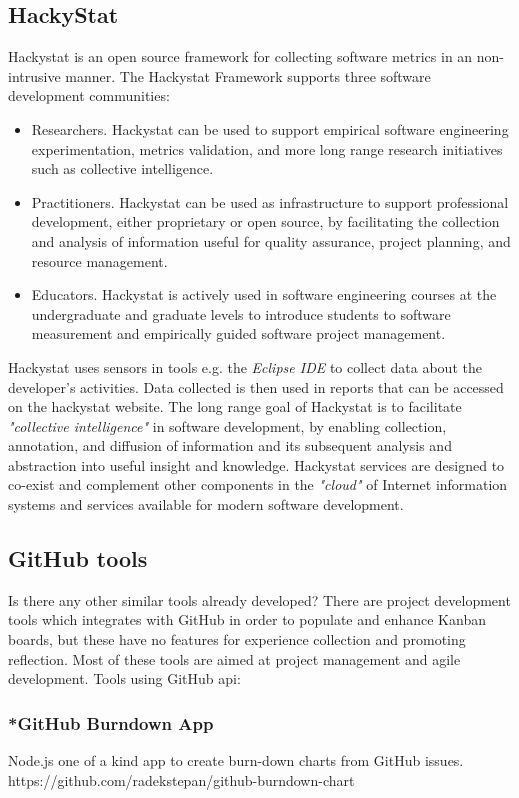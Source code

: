 \subsection{HackyStat}
Hackystat is an open source framework for collecting software metrics in an non-intrusive manner. 
The Hackystat Framework supports three software development communities:
\begin{itemize}
	\item Researchers. Hackystat can be used to support empirical software engineering experimentation, metrics validation, and more long range research initiatives such as collective intelligence.
	\item Practitioners. Hackystat can be used as infrastructure to support professional development, either proprietary or open source, by facilitating the collection and analysis of information useful for quality assurance, project planning, and resource management.
	\item Educators. Hackystat is actively used in software engineering courses at the undergraduate and graduate levels to introduce students to software measurement and empirically guided software project management.
\end{itemize}
Hackystat uses sensors in tools e.g. the \emph{Eclipse IDE} to collect data about the developer's activities. Data collected is then used in reports that can be accessed on the hackystat website. 
The long range goal of Hackystat is to facilitate \emph{"collective intelligence"} in software development, by enabling collection, annotation, and diffusion of information and its subsequent analysis and abstraction into useful insight and knowledge. Hackystat services are designed to co-exist and complement other components in the \emph{"cloud"} of Internet information systems and services available for modern software development.\\ 

\subsection{GitHub tools}
\label{subsec:gittools}
Is there any other similar tools already developed? There are project development tools which integrates with GitHub in order to populate and enhance Kanban boards, but these have no features for experience collection and promoting reflection. Most of these tools are aimed at project management and agile development. 
Tools using GitHub api: \\
\subsubsection{*GitHub Burndown App}
Node.js one of a kind app to create burn-down charts from GitHub issues. 
https://github.com/radekstepan/github-burndown-chart
